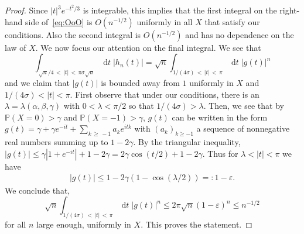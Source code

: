 \documentclass[10pt]{amsart}
\theoremstyle{definition}\newtheorem{defi}[theo]{Definition}\newtheorem{rema}[theo]{Remark}\newtheorem{exam}[theo]{Example}\newtheorem{exem}[theo]{Example}\newtheorem{nota}[theo]{Notation}
\renewcommand{\P}{\mathbb{P}}
\DeclareMathOperator{\dtseq}{d\mathit{t}}
\begin{document}
\begin{proof}
Since $|t|^3 e^{-t^2/3}$ is integrable, this implies that the first integral on the right-hand side of~\eqref{eq:OoO} is $O(n^{-1/2})$ uniformly in all $X$ that satisfy our conditions. Also the second integral is $O(n^{-1/2})$ and has no dependence on the law of $X$. We now focus our attention on the final integral. We see that
\[
\int_{\sqrt{n}/4\,<\,|t|\,<\,\pi\sigma \sqrt{n }} \dtseq |h_{n}(t)|= \sqrt{n}\int_{1/(4\sigma)\,<\,|t|\,<\,\pi} \dtseq |g(t)|^n
\]
and we claim that $|g(t)|$ is bounded away from $1$ uniformly in $X$ and $1/(4\sigma)<|t|<\pi$. First observe that under our conditions, there is an $\lambda=\lambda(\alpha,\beta,\gamma)$ with $0<\lambda<\pi/2$ so that $1/(4\sigma)>\lambda$. Then, we see that by $\P(X=0)>\gamma$ and $\P(X=-1)>\gamma$, $g(t)$ can be written in the form $g(t)=\gamma+\gamma e^{-it}+ \sum_{k\,\ge\,-1} a_{k }e^{itk}$ with $(a_{k})_{k\ge -1}$ a sequence of nonnegative real numbers summing up to $1-2\gamma$. By the triangular inequality, $|g(t)| \leq \gamma|1+e^{- it}|+1-2\gamma= 2\gamma\cos(t/2)+1-2\gamma$. Thus for $\lambda<|t|<\pi$ we have
\begin{align*}
|g(t)| \le 1-2\gamma(1-\cos(\lambda/2))=:1-\varepsilon.
\end{align*}
We conclude that,
\[
\sqrt{n}\int_{1/(4\sigma)\,<\,|t|\,<\,\pi} \dtseq |g(t)|^n\leq 2\pi \sqrt{n} (1-\varepsilon)^n\leq n^{-1/2}
\]
for all $n$ large enough, uniformly in $X$. This proves the statement.
\end{proof}
\end{document}
